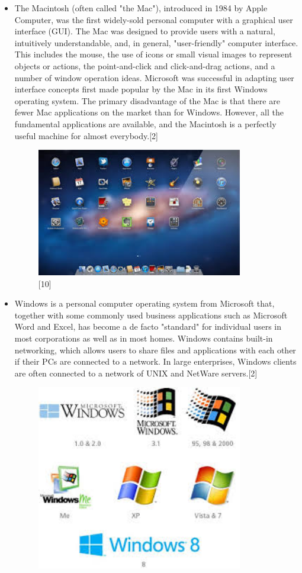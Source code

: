 \documentclass[11pt,a4paper]{article}
\begin{document}
\begin{itemize}
		\newpage
		\item The Macintosh (often called "the Mac"), introduced in 1984 by Apple Computer, was the first widely-sold personal computer with a graphical user interface (GUI). The Mac was designed to provide users with a natural, intuitively understandable, and, in general, "user-friendly" computer interface. This includes the mouse, the use of icons or small visual images to represent objects or actions, the point-and-click and click-and-drag actions, and a number of window operation ideas. Microsoft was successful in adapting user interface concepts first made popular by the Mac in its first Windows operating system. The primary disadvantage of the Mac is that there are fewer Mac applications on the market than for Windows. However, all the fundamental applications are available, and the Macintosh is a perfectly useful machine for almost everybody.[2]
			\begin{figure}[h!]
				\includegraphics[width=9cm]{mac.jpg}
				\centering
				\caption{[10]}
			\end{figure} 
		\newpage
		\item Windows is a personal computer operating system from Microsoft that, together with some commonly used business applications such as Microsoft Word and Excel, has become a de facto "standard" for individual users in most corporations as well as in most homes. Windows contains built-in networking, which allows users to share files and applications with each other if their PCs are connected to a network. In large enterprises, Windows clients are often connected to a network of UNIX and NetWare servers.[2]
			\begin{figure}[h!]
				\includegraphics[width=9cm]{windows.jpg}

\end{figure}
\end{itemize}
\end{document}
